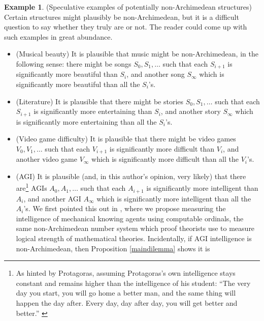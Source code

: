 \documentclass[reqno]{article}
\theoremstyle{definition}
\newtheorem{example}[theorem]{Example}
\begin{document}
\begin{example}
\label{speculativeexamples}
    (Speculative examples of potentially non-Archimedean structures)
    Certain structures might plausibly be non-Archimedean, but it is a difficult
    question to say whether they truly are or not. The reader could come up with
    such examples in great abundance.
    \begin{itemize}
        \item
        (Musical beauty)
        It is plausible that music might be non-Archimedean, in the following
        sense: there might be songs $S_0,S_1,\ldots$ such that each $S_{i+1}$
        is significantly more beautiful than $S_i$, and another song
        $S_\infty$ which is significantly more beautiful than all the $S_i$'s.
        \item
        (Literature)
        It is plausible that there might be stories $S_0,S_1,\ldots$ such that
        each $S_{i+1}$ is significantly more entertaining than $S_i$, and
        another story $S_\infty$ which is significantly more entertaining than
        all the $S_i$'s.
        \item
        (Video game difficulty)
        It is plausible that there might be video games $V_0,V_1,\ldots$ such that
        each $V_{i+1}$ is significantly more difficult than $V_i$, and another
        video game $V_\infty$ which is significantly more difficult than
        all the $V_i$'s.
        \item
        (AGI)
        It is plausible (and, in this author's opinion, very likely) that there
        are\footnote{As hinted by Protagoras, assuming Protagoras's own intelligence
        stays constant and remains higher than the intelligence of his student:
        ``The very day you start, you will go home a better man, and the same thing
        will happen the day after. Every day, day after day, you will get better
        and better.'' \cite{protagoras}} AGIs $A_0,A_1,\ldots$ such that
        each $A_{i+1}$ is significantly more
        intelligent than $A_i$, and another AGI $A_\infty$ which is significantly more
        intelligent than all the $A_i$'s. We first pointed this out in
        \cite{alexander2019measuring}, where we propose measuring the
        intelligence of mechanical
        knowing agents using computable ordinals, the same non-Archimedean number system
        which proof theorists use to measure logical strength of mathematical
        theories. Incidentally, if AGI intelligence is non-Archimedean, then
        Proposition \ref{maindilemma} shows it is

\end{itemize}
\end{example}
\end{document}
